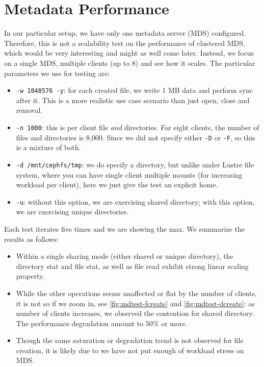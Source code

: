 \documentclass{article}
\begin{document}
\section{Metadata Performance}


In our particular setup, we have only one metadata server (MDS)
configured. Therefore, this is not a scalability test on the performance of
clustered MDS, which would be very interesting and might as well come later.
Instead, we focus on a single MDS, multiple clients (up to 8) and see how it
scales. The particular parameters we use for testing are:

\begin{itemize}
\item \verb!-w 1048576 -y!: for each created file, we write 1 MB data and
perform sync after it. This is a more realistic use case scenario than just
open, close and removal.

\item \verb!-n 1000!: this is per client file \textit{and} directories. For eight
clients, the number of files and directories is 8,000. Since we did not specify
either \verb!-D! or \verb!-F!, so this is a mixture of both.

\item \verb!-d /mnt/cephfs/tmp!: we do specify a directory, but unlike under
Lustre file system, where you can have single client multiple mounts (for
increasing workload per client), here we just give the test an explicit home.

\item \verb!-u!: without this option, we are exercising shared directory; with
this option, we are exercising unique directories.

\end{itemize}

Each test iterates five times and we are showing the max. 
We summarize the results as follows:


\begin{itemize}

\item Within a single sharing mode (either shared or unique directory), the
directory stat and file stat, as well as file read exhibit strong linear
scaling property. 

\item While the other operations seems unaffected or flat by the number of
clients, it is not so if we zoom in, see \ref{fig:mdtest-fcreate} and
\ref{fig:mdtest-dcreate}:  as number of clients increases, we observed the
contention for shared directory. The performance degradation amount to 50\% or
more.

\item Though the same saturation or degradation trend is not observed for file
creation, it is likely due to we have not put enough of workload stress on MDS.

\end{itemize}
\end{document}
